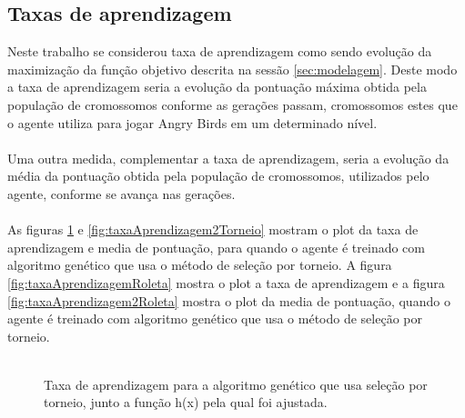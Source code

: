 \documentclass[10pt,a4paper]{article}
\begin{document}
\subsection{Taxas de aprendizagem} 
Neste trabalho se considerou taxa de aprendizagem como sendo evolução da maximização da função objetivo descrita na sessão \ref{sec:modelagem}. Deste modo a taxa de aprendizagem seria a evolução da pontuação máxima obtida pela população de cromossomos conforme as gerações passam, cromossomos estes que o agente utiliza para jogar Angry Birds em um determinado nível. \\ \\
Uma outra medida, complementar a taxa de aprendizagem, seria a evolução da média da pontuação obtida pela população de cromossomos, utilizados pelo agente, conforme se avança nas gerações. \\ \\
As figuras \ref{fig:taxaAprendizagemTorneio} e \ref{fig:taxaAprendizagem2Torneio} mostram o plot da taxa de aprendizagem e media de pontuação, para quando o agente é treinado com algoritmo genético que usa o método de seleção por torneio. A figura \ref{fig:taxaAprendizagemRoleta}  mostra o plot a taxa de aprendizagem e a figura \ref{fig:taxaAprendizagem2Roleta}  mostra o plot da media de pontuação, quando o agente é treinado com algoritmo genético que usa o método de seleção por torneio. \\ \\
\begin{figure}[H]
  \center
  \caption{Taxa de aprendizagem para a algoritmo genético que usa seleção por torneio, junto a função h(x) pela qual foi ajustada.}
  \label{fig:taxaAprendizagemTorneio}
\end{figure}
\end{document}
